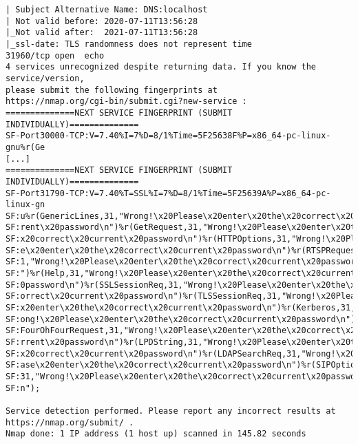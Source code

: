\documentclass[a4paper]{report}
\begin{document}
\begin{verbatim}
| Subject Alternative Name: DNS:localhost
| Not valid before: 2020-07-11T13:56:28
|_Not valid after:  2021-07-11T13:56:28
|_ssl-date: TLS randomness does not represent time
31960/tcp open  echo
4 services unrecognized despite returning data. If you know the service/version, 
please submit the following fingerprints at 
https://nmap.org/cgi-bin/submit.cgi?new-service :
==============NEXT SERVICE FINGERPRINT (SUBMIT INDIVIDUALLY)==============
SF-Port30000-TCP:V=7.40%I=7%D=8/1%Time=5F25638F%P=x86_64-pc-linux-gnu%r(Ge
[...]
==============NEXT SERVICE FINGERPRINT (SUBMIT INDIVIDUALLY)==============
SF-Port31790-TCP:V=7.40%T=SSL%I=7%D=8/1%Time=5F25639A%P=x86_64-pc-linux-gn
SF:u%r(GenericLines,31,"Wrong!\x20Please\x20enter\x20the\x20correct\x20cur
SF:rent\x20password\n")%r(GetRequest,31,"Wrong!\x20Please\x20enter\x20the\
SF:x20correct\x20current\x20password\n")%r(HTTPOptions,31,"Wrong!\x20Pleas
SF:e\x20enter\x20the\x20correct\x20current\x20password\n")%r(RTSPRequest,3
SF:1,"Wrong!\x20Please\x20enter\x20the\x20correct\x20current\x20password\n
SF:")%r(Help,31,"Wrong!\x20Please\x20enter\x20the\x20correct\x20current\x2
SF:0password\n")%r(SSLSessionReq,31,"Wrong!\x20Please\x20enter\x20the\x20c
SF:orrect\x20current\x20password\n")%r(TLSSessionReq,31,"Wrong!\x20Please\
SF:x20enter\x20the\x20correct\x20current\x20password\n")%r(Kerberos,31,"Wr
SF:ong!\x20Please\x20enter\x20the\x20correct\x20current\x20password\n")%r(
SF:FourOhFourRequest,31,"Wrong!\x20Please\x20enter\x20the\x20correct\x20cu
SF:rrent\x20password\n")%r(LPDString,31,"Wrong!\x20Please\x20enter\x20the\
SF:x20correct\x20current\x20password\n")%r(LDAPSearchReq,31,"Wrong!\x20Ple
SF:ase\x20enter\x20the\x20correct\x20current\x20password\n")%r(SIPOptions,
SF:31,"Wrong!\x20Please\x20enter\x20the\x20correct\x20current\x20password\
SF:n");

Service detection performed. Please report any incorrect results at 
https://nmap.org/submit/ .
Nmap done: 1 IP address (1 host up) scanned in 145.82 seconds




\end{verbatim}
\end{document}
